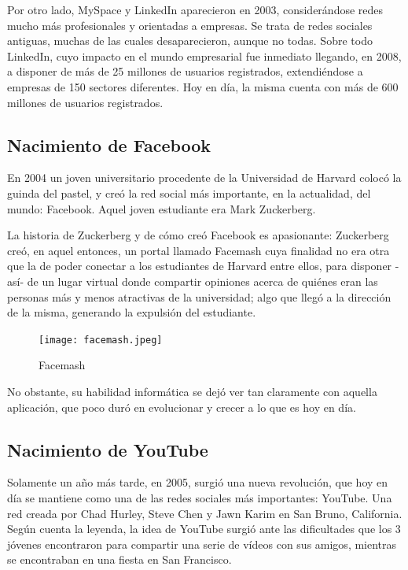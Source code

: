Por otro lado, MySpace y LinkedIn aparecieron en 2003, considerándose redes mucho más profesionales y orientadas a empresas. Se trata de redes sociales antiguas, muchas de las cuales desaparecieron, aunque no todas. Sobre todo LinkedIn, cuyo impacto en el mundo empresarial fue inmediato llegando, en 2008, a disponer de más de 25 millones de usuarios registrados, extendiéndose a empresas de 150 sectores diferentes. Hoy en día, la misma cuenta con más de 600 millones de usuarios registrados.

\subsection{Nacimiento de Facebook}

En 2004 un joven universitario procedente de la Universidad de Harvard colocó la guinda del pastel, y creó la red social más importante, en la actualidad, del mundo: Facebook. Aquel joven estudiante era Mark Zuckerberg.

La historia de Zuckerberg y de cómo creó Facebook es apasionante: Zuckerberg creó, en aquel entonces, un portal llamado Facemash cuya finalidad no era otra que la de poder conectar a los estudiantes de Harvard entre ellos, para disponer -así- de un lugar virtual donde compartir opiniones acerca de quiénes eran las personas más y menos atractivas de la universidad; algo que llegó a la dirección de la misma, generando la expulsión del estudiante.

\begin{figure}[ht!]
    \texttt{[image: facemash.jpeg]}
    \caption{Facemash}
    \label{facemash}
\end{figure}

No obstante, su habilidad informática se dejó ver tan claramente con aquella aplicación, que poco duró en evolucionar y crecer a lo que es hoy en día.

\subsection{Nacimiento de YouTube}

Solamente un año más tarde, en 2005, surgió una nueva revolución, que hoy en día se mantiene como una de las redes sociales más importantes: YouTube. Una red creada por Chad Hurley, Steve Chen y Jawn Karim en San Bruno, California. Según cuenta la leyenda, la idea de YouTube surgió ante las dificultades que los 3 jóvenes encontraron para compartir una serie de vídeos con sus amigos, mientras se encontraban en una fiesta en San Francisco.

